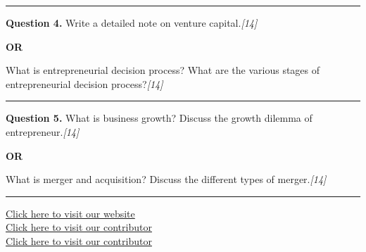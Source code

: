 \documentclass[11pt,a4paper]{article}
\newcommand{\pts}[1]{\hfill   \textit{[#1]}}
\begin{document}
\medskip\rule{\linewidth}{0.2pt}




\noindent   \textbf{Question 4.}
Write a detailed note on venture capital.\pts{14}

\centerline{   \textbf{OR}}

What is entrepreneurial decision process? What are the various stages of entrepreneurial decision process?\pts{14}

\medskip\rule{\linewidth}{0.2pt}




\noindent   \textbf{Question 5.}
What is business growth? Discuss the growth dilemma of entrepreneur.\pts{14}

\centerline{   \textbf{OR}}

What is merger and acquisition? Discuss the different types of merger.\pts{14}

\vfill
\rule{\linewidth}{0.4pt}

\begin{center}\small
\href{https://bhu-exam.vercel.app/}{Click here to visit our website}\\[4pt]
\href{https://me-aryan.vercel.app/}{Click here to visit our contributor}\\[4pt]
\href{https://quashan-me.vercel.app/}{Click here to visit our contributor}
\end{center}
\end{document}
